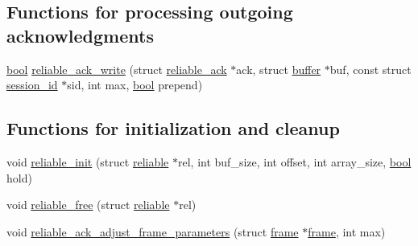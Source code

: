 \subsection*{Functions for processing outgoing acknowledgments}
\begin{DoxyCompactItemize}
\item 
\hyperlink{automatic_8c_abb452686968e48b67397da5f97445f5b}{bool} \hyperlink{group__reliable_ga6875d0fb65bdd960736068b2e0fe4a29}{reliable\+\_\+ack\+\_\+write} (struct \hyperlink{structreliable__ack}{reliable\+\_\+ack} $\ast$ack, struct \hyperlink{structbuffer}{buffer} $\ast$buf, const struct \hyperlink{structsession__id}{session\+\_\+id} $\ast$sid, int max, \hyperlink{automatic_8c_abb452686968e48b67397da5f97445f5b}{bool} prepend)
\end{DoxyCompactItemize}
\subsection*{Functions for initialization and cleanup}
\begin{DoxyCompactItemize}
\item 
void \hyperlink{group__reliable_gab5e5ef6d6fd862187abe76f88b972ee5}{reliable\+\_\+init} (struct \hyperlink{structreliable}{reliable} $\ast$rel, int buf\+\_\+size, int offset, int array\+\_\+size, \hyperlink{automatic_8c_abb452686968e48b67397da5f97445f5b}{bool} hold)
\item 
void \hyperlink{group__reliable_ga0315c8ecda1aafbfb61e6ab1b8c2477b}{reliable\+\_\+free} (struct \hyperlink{structreliable}{reliable} $\ast$rel)
\item 
void \hyperlink{group__reliable_gaaf4135caf45a800b9accff968aaa59d6}{reliable\+\_\+ack\+\_\+adjust\+\_\+frame\+\_\+parameters} (struct \hyperlink{structframe}{frame} $\ast$\hyperlink{structframe}{frame}, int max)
\end{DoxyCompactItemize}
